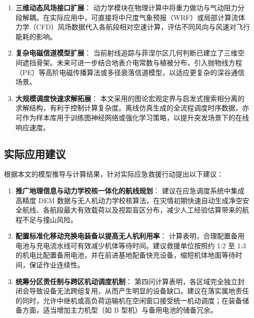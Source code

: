 \begin{enumerate}
    \item \textbf{三维动态风场接口扩展}：
    动力学模块在物理计算中将重力做功与气动阻力分段解耦。在实际应用中，可直接将中尺度气象预报（WRF）或局部计算流体力学（CFD）风场数据代入各航段相对空速计算，评估不同风向与风速对飞行能耗的影响。
    
    \item \textbf{复杂电磁信道模型扩展}：
    当前射线追踪与菲涅尔区几何判断已建立了三维空间遮挡骨架。未来可进一步结合地表介电常数与植被分布，引入抛物线方程（PE）等高阶电磁传播算法或多径衰落信道模型，以适应更复杂的深谷通信场景。
    
    \item \textbf{大规模调度快速求解拓展}：
    本文采用的图论宏观定界与启发式搜索相分离的求解结构，有利于控制计算复杂度。离线仿真生成的全流程调度时序数据，亦可作为样本库用于训练图神经网络或强化学习策略，以提升突发场景下的在线响应速度。
\end{enumerate}

\subsection{实际应用建议}

根据本文的模型推导与计算结果，针对实际应急救援行动提出以下建议：

\begin{enumerate}
    \item \textbf{推广地理信息与动力学校核一体化的航线规划}：
    建议在应急调度系统中集成高精度 DEM 数据与无人机动力学校核算法，在灾情初期快速自动生成净空安全航线、各航段最大有效载荷以及视距盲区分布，减少人工经验估算带来的航程不足与撞山风险。
    
    \item \textbf{配置标准化移动充换电装备以提高无人机利用率}：
    计算表明，合理配置备用电池与充电流水线可有效减少机体等待时间。建议救援单位按照约 1:2 至 1:3 的机电比配置备用电池，并在前进基地配备快充设备，缩短机体地面等待时间，保证作业连续性。
    
    \item \textbf{统筹分区责任制与跨区机动调度机制}：
    第四问计算表明，各区域完全独立封闭会导致设备无法跨组复用，从而产生明显的设备缺口。建议在落实属地责任的同时，允许中继机或高负荷运输机在空闲窗口接受统一机动调度；在装备储备方面，适当增加主力机型（如 B 型机）与备用电池的储备冗余。
\end{enumerate}
